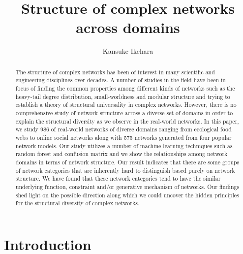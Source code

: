 \documentclass{article}
\begin{document}
\title{Structure of complex networks across domains}
\author{Kansuke Ikehara}
\maketitle

\begin{abstract}
The structure of complex networks has been of interest in many scientific and engineering disciplines over decades. A number of studies in the field have been in focus of finding the common properties among different kinds of networks such as the heavy-tail degree distribution, small-worldness and modular structure and trying to establish a theory of structural universality in complex networks. However, there is no comprehensive study of network structure across a diverse set of domains in order to explain the structural diversity as we observe in the real-world networks. In this paper, we study 986 of real-world networks of diverse domains ranging from ecological food webs to online social networks along with 575 networks generated from four popular network models. Our study utilizes a number of  machine learning techniques such as random forest and confusion matrix and we show the relationships among network domains in terms of network structure. Our result indicates that there are some groups of network categories that are inherently hard to distinguish based purely on network structure. We have found that these network categories tend to have the similar underlying function, constraint and/or generative mechanism of networks. Our findings shed light on the possible direction along which we could uncover the hidden principles for the structural diversity of complex networks.
  
\end{abstract}
\tableofcontents

\newpage
\section{Introduction}
\end{document}
